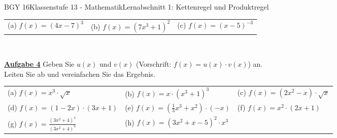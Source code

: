 \documentclass[oneside,openany,headings=optiontotoc,11pt,numbers=noenddot]{scrreprt}
\begin{document}
\begin{worksheet}{BGY 16}{Klassenstufe 13 - Mathematik}{Lernabschnitt 1: Kettenregel und Produktregel}
\begin{framed}
\begin{tabularx}{\textwidth}{lll}
				(a) \(f(x) = (4x-7)^3\) & (b) \(f(x) = (7x^3 + 1)^2\) & (c) \(f(x) = (x-5)^{-3}\)\\
			\end{tabularx}\\
			\par\noindent
			\textbf{\underline{Aufgabe 4}} Geben Sie \(u(x)\) und \(v(x)\) (Vorschrift: \(f(x) = u(x)\cdot{}v(x)\)) an.\\
			Leiten Sie ab und vereinfachen Sie das Ergebnis.\\
			\begin{tabularx}{\textwidth}{lll}
				(a) \(f(x) = x^3\cdot{}\sqrt{x}\) & (b) \(f(x) = x\cdot(x^3+1)^3\) & (c) \(f(x) = (2x^2-x)\cdot\sqrt{x}\)\\
				(d) \(f(x) = (1-2x)\cdot(3x+1)\) & (e) \(f(x) = (\frac{1}{3}x^3 +x^2)\cdot{}(-x)\) & (f) \(f(x) = x^2\cdot(2x+1)\)\\
				(g) \(f(x) = \frac{(3x^2+4)^4}{(3x^2+4)^3}\) & (h) \(f(x) = (3x^2+x-5)^2\cdot{}x^3\)
			\end{tabularx}
		\end{framed}
	\end{worksheet}
\end{document}
